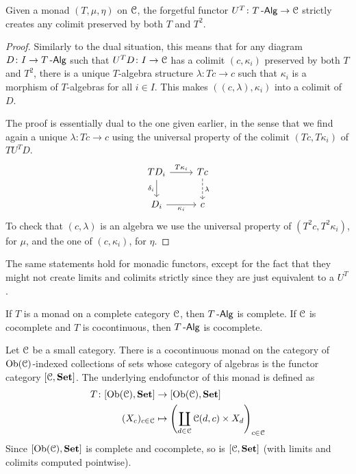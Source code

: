 \documentclass[a4paper,11pt,oneside,openany]{scrbook}
\begin{document}
\begin{prop}\label{create colims}
	Given a monad $(T,\mu,\eta)$ on $\operatorname{\mathcal{C}}$, the forgetful functor $U^T\colon T\operatorname{-\mathsf{Alg}}\rightarrow\operatorname{\mathcal{C}}$ strictly creates any colimit preserved by both $T$ and $T^2$.
\end{prop}

\begin{proof}
	Similarly to the dual situation, this means that for any diagram $D\colon I\rightarrow T\operatorname{-\mathsf{Alg}}$ such that $U^TD\colon I\rightarrow\operatorname{\mathcal{C}}$ has a colimit $(c,\kappa_i)$ preserved by both $T$ and $T^2$, there is a unique $T$-algebra structure $\lambda\colon Tc\rightarrow c$ such that $\kappa_i$ is a morphism of $T$-algebras for all $i\in I$. This makes $((c,\lambda),\kappa_i)$ into a colimit of $D$.

	The proof is essentially dual to the one given earlier, in the sense that we
	find again a unique $\lambda\colon Tc\rightarrow c$ using the universal
	property of the colimit $(Tc,T\kappa_i)$ of $TU^TD$.
	\[
		\begin{tikzcd}
			TD_i\ar[r, "T\kappa_i"]\ar[d, "\delta_i"']
			& Tc\ar[d, dashed, "\lambda"] \\
			D_i\ar[r, "\kappa_i"']
			& c
		\end{tikzcd}
	\]
	To check that $(c,\lambda)$ is an algebra we use the universal property of $(T^2c,T^2\kappa_i)$, for $\mu$, and the one of $(c,\kappa_i)$, for $\eta$.
\end{proof}

\begin{rmk}
	The same statements hold for monadic functors, except for the fact that they might not create limits and colimits strictly since they are just equivalent to a $U^T$.
\end{rmk}

\begin{rmk}
	If $T$ is a monad on a complete category $\operatorname{\mathcal{C}}$, then $T\operatorname{-\mathsf{Alg}}$ is complete. If $\operatorname{\mathcal{C}}$ is cocomplete and $T$ is cocontinuous, then $T\operatorname{-\mathsf{Alg}}$ is cocomplete.
\end{rmk}

\begin{exmp}
	Let $\operatorname{\mathcal{C}}$ be a small category. There is a cocontinuous monad on the category of $\operatorname{Ob}(\operatorname{\mathcal{C}})$-indexed collections of sets whose category of algebras is the functor category $[\operatorname{\mathcal{C}},{\normalfont\textbf{Set}}]$. The underlying endofunctor of this monad is defined as
	\begin{align*}
		T\colon[\operatorname{Ob}(\operatorname{\mathcal{C}}),{\normalfont\textbf{Set}}] & \to[\operatorname{Ob}(\operatorname{\mathcal{C}}),{\normalfont\textbf{Set}}]                                               \\
		(X_c)_{c\in\operatorname{\mathcal{C}}}        & \mapsto \left(\coprod_{d\in\operatorname{\mathcal{C}}}\operatorname{\mathcal{C}}(d,c)\times X_d\right)_{c\in\operatorname{\mathcal{C}}}
	\end{align*}
	Since $[\operatorname{Ob}(\operatorname{\mathcal{C}}),{\normalfont\textbf{Set}}]$ is complete and cocomplete, so is $[\operatorname{\mathcal{C}},{\normalfont\textbf{Set}}]$ (with limits and colimits computed pointwise).
\end{exmp}
\end{document}

